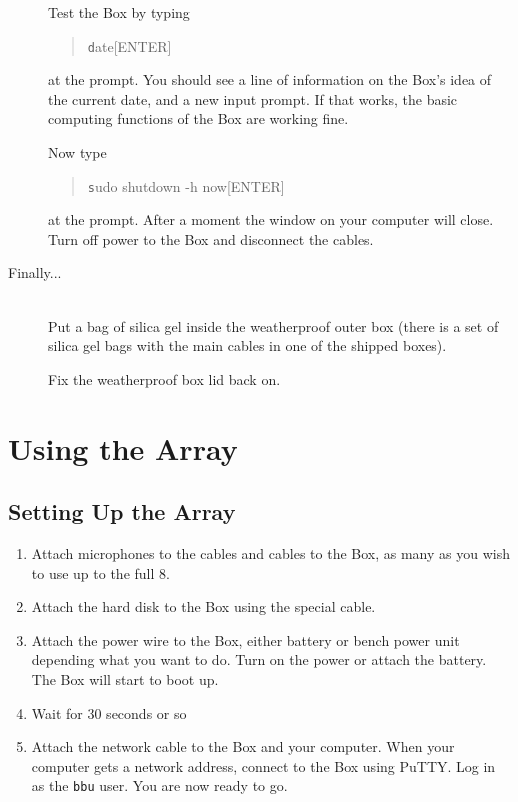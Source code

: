 \documentclass[12pt]{article}
\begin{document}
\begin{description}
  Test the Box by typing
\begin{quotation}\texttt
       date[ENTER]
\end{quotation}
  at the prompt.  You should see a line of information on the Box's
  idea of the current date, and a new input prompt.  If that works,
  the basic computing functions of the Box are working fine.

  Now type
\begin{quotation}\texttt
      sudo shutdown -h now[ENTER]
\end{quotation}
  at the prompt.  After a moment the window on your computer will
  close.  Turn off power to the Box and disconnect the cables.

  \item[Finally...] ~\\

  Put a bag of silica gel inside the weatherproof outer box (there is
  a set of silica gel bags with the main cables in one of the shipped
  boxes).

  Fix the weatherproof box lid back on.

\end{description}

\section{Using the Array}

\subsection{Setting Up the Array}

\begin{enumerate}

   \item  Attach microphones to the cables and cables to the Box, as
        many as you wish to use up to the full 8.

   \item  Attach the hard disk to the Box using the special cable.

   \item  Attach the power wire to the Box, either battery or bench
        power unit depending what you want to do.  Turn on the power
        or attach the battery.  The Box will start to boot up.

   \item  Wait for 30 seconds or so

   \item  Attach the network cable to the Box and your computer.  When
        your computer gets a network address, connect to the Box using
        PuTTY.  Log in as the \texttt{bbu} user.  You are now ready to go.

\end{enumerate}
\end{document}
